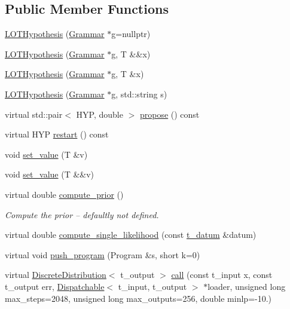 \subsection*{Public Member Functions}
\begin{DoxyCompactItemize}
\item 
\hyperlink{class_l_o_t_hypothesis_a47dcb988a9cb4bba00263851d697fc12}{L\+O\+T\+Hypothesis} (\hyperlink{class_grammar}{Grammar} $\ast$g=nullptr)
\item 
\hyperlink{class_l_o_t_hypothesis_abfb19603c9bdda8b8b8c682b6cdc6e03}{L\+O\+T\+Hypothesis} (\hyperlink{class_grammar}{Grammar} $\ast$g, T \&\&x)
\item 
\hyperlink{class_l_o_t_hypothesis_a3123d5e4e140ca24fdaa568bd2b17644}{L\+O\+T\+Hypothesis} (\hyperlink{class_grammar}{Grammar} $\ast$g, T \&x)
\item 
\hyperlink{class_l_o_t_hypothesis_a09216df69fea175ccb5ffc1a947b8287}{L\+O\+T\+Hypothesis} (\hyperlink{class_grammar}{Grammar} $\ast$g, std\+::string s)
\item 
virtual std\+::pair$<$ H\+YP, double $>$ \hyperlink{class_l_o_t_hypothesis_ab6cff786f845f0001b497cc606d14c5a}{propose} () const
\item 
virtual H\+YP \hyperlink{class_l_o_t_hypothesis_a1224617b004cc10b4c5b17b9da58fbd8}{restart} () const
\item 
void \hyperlink{class_l_o_t_hypothesis_a873355cca03609ac0ab405d29314e591}{set\+\_\+value} (T \&v)
\item 
void \hyperlink{class_l_o_t_hypothesis_ac07e0957d2e586f2cc84821795d5c462}{set\+\_\+value} (T \&\&v)
\item 
virtual double \hyperlink{class_l_o_t_hypothesis_ae0ea0b1cd5f7a89ef86f440276f04c4e}{compute\+\_\+prior} ()
\begin{DoxyCompactList}\small\item\em Compute the prior -- defaultly not defined. \end{DoxyCompactList}\item 
virtual double \hyperlink{class_l_o_t_hypothesis_aefea6d0e5d94b1fc716dedb9b25b7b26}{compute\+\_\+single\+\_\+likelihood} (const \hyperlink{class_l_o_t_hypothesis_a26d0ecfa6a367f32276d36cd01c0cead}{t\+\_\+datum} \&datum)
\item 
virtual void \hyperlink{class_l_o_t_hypothesis_a0c0048d364936ae2a1bbeeca08959215}{push\+\_\+program} (Program \&s, short k=0)
\item 
virtual \hyperlink{class_discrete_distribution}{Discrete\+Distribution}$<$ t\+\_\+output $>$ \hyperlink{class_l_o_t_hypothesis_a592d67c976a67982251239b415e0a861}{call} (const t\+\_\+input x, const t\+\_\+output err, \hyperlink{class_dispatchable}{Dispatchable}$<$ t\+\_\+input, t\+\_\+output $>$ $\ast$loader, unsigned long max\+\_\+steps=2048, unsigned long max\+\_\+outputs=256, double minlp=-\/10.)

\end{DoxyCompactItemize}
